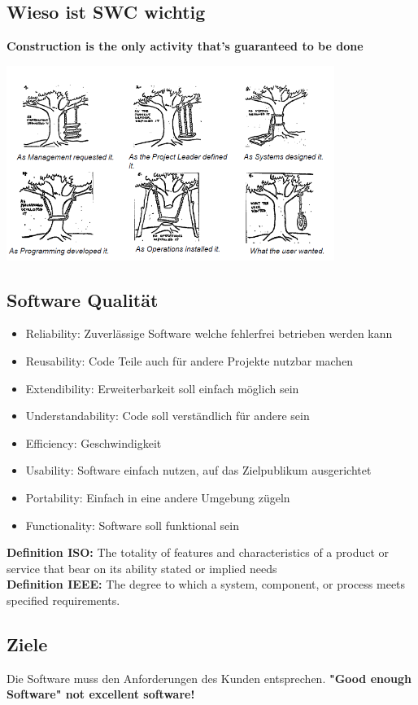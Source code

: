 \documentclass[10pt]{article}
\begin{document}
\subsection{Wieso ist SWC wichtig}
\textbf{Construction is the only activity that's guaranteed to be done}
\begin{center}
	\includegraphics[width=0.8\textwidth]{assets/typical_project}
\end{center}

\subsection{Software Qualität}
\begin{itemize}
	\item Reliability: Zuverlässige Software welche fehlerfrei betrieben werden kann
	\item Reusability: Code Teile auch für andere Projekte nutzbar machen
	\item Extendibility: Erweiterbarkeit soll einfach möglich sein
	\item Understandability: Code soll verständlich für andere sein
	\item Efficiency: Geschwindigkeit
	\item Usability: Software einfach nutzen, auf das Zielpublikum ausgerichtet
	\item Portability: Einfach in eine andere Umgebung zügeln
	\item Functionality: Software soll funktional sein
\end{itemize}
\textbf{Definition ISO:} The totality of features and characteristics of a product or service that bear on its ability stated or implied needs
\\
\textbf{Definition IEEE:} The degree to which a system, component, or process meets specified requirements.

\subsection{Ziele}
Die Software muss den Anforderungen des Kunden entsprechen. \textbf{"Good enough Software" not excellent software!}
\end{document}
